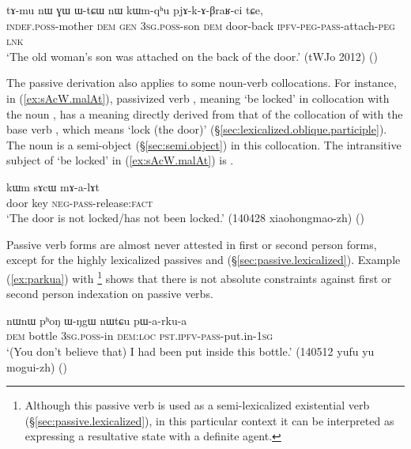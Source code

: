 \begin{exe}
\ex \label{ex:kWmqhu.pjAkABraRci}
 \gll tɤ-mu nɯ ɣɯ ɯ-tɕɯ nɯ kɯm-qʰu pjɤ-k-ɤ-βraʁ-ci tɕe,\\
 \textsc{indef}.\textsc{poss}-mother \textsc{dem} \textsc{gen} \textsc{3sg}.\textsc{poss}-son \textsc{dem} door-back \textsc{ipfv}-\textsc{peg}-\textsc{pass}-attach-\textsc{peg} \textsc{lnk} \\
\glt `The old woman's son was attached on the back of the door.' (tWJo 2012) 	()
  \end{exe}

The passive derivation also applies to some noun-verb collocations. For instance, in (\ref{ex:sAcW.malAt}),  passivized verb , meaning `be locked' in collocation with the noun , has a meaning directly derived from that of the collocation of  with the base verb , which means `lock (the door)' (§\ref{sec:lexicalized.oblique.participle}). The noun  is a semi-object (§\ref{sec:semi.object}) in this collocation. The intransitive subject of  `be locked' in (\ref{ex:sAcW.malAt}) is .
 

\begin{exe}
\ex \label{ex:sAcW.malAt}
 \gll  kɯm sɤcɯ mɤ-a-lɤt \\
door key \textsc{neg}-\textsc{pass}-release:\textsc{fact} \\
\glt `The door is not locked/has not been locked.' (140428 xiaohongmao-zh) ()
 \end{exe}
 
 
Passive verb forms are almost never attested in first or second person forms, except for the highly lexicalized passives  and  (§\ref{sec:passive.lexicalized}). Example (\ref{ex:parkua}) with \footnote{Although this passive verb is used as a semi-lexicalized existential verb (§\ref{sec:passive.lexicalized}), in this particular context it can be interpreted as expressing a resultative state with a definite agent. } shows that there is not absolute constraints against first or second person indexation on passive verbs. 
 
\begin{exe}
\ex \label{ex:parkua}
 \gll  nɯnɯ pʰoŋ ɯ-ŋgɯ nɯtɕu pɯ-a-rku-a \\
 \textsc{dem} bottle \textsc{3sg}.\textsc{poss}-in \textsc{dem}:\textsc{loc} \textsc{pst}.\textsc{ipfv}-\textsc{pass}-put.in-\textsc{1sg} \\
 \glt `(You don't believe that) I had been put inside this bottle.' (140512 yufu yu mogui-zh) ()
\end{exe}

